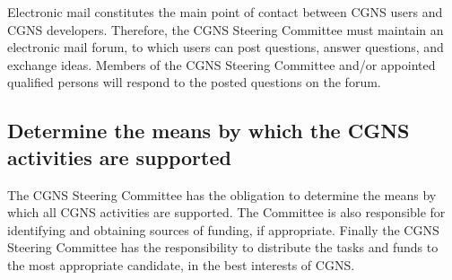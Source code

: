 Electronic mail constitutes the main point of contact between CGNS
users and CGNS developers.
Therefore, the CGNS Steering Committee must maintain an electronic mail
forum, to which users can post questions, answer questions, and exchange
ideas.
Members of the CGNS Steering Committee and/or appointed qualified
persons will respond to the posted questions on the forum.

\subsection{Determine the means by which the CGNS activities are supported}
\label{s:support}

The CGNS Steering Committee has the obligation to determine the means by
which all CGNS activities are supported.
The Committee is also responsible for identifying and obtaining sources
of funding, if appropriate.
Finally the CGNS Steering Committee has the responsibility to distribute
the tasks and funds to the most appropriate candidate, in the best
interests of CGNS.
